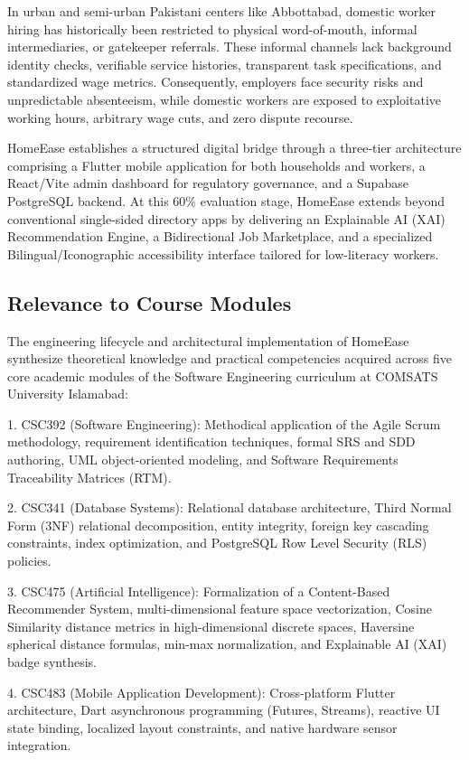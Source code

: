 \documentclass[12pt,a4paper]{article}
\begin{document}
In urban and semi-urban Pakistani centers like Abbottabad, domestic worker hiring has historically been restricted to physical word-of-mouth, informal intermediaries, or gatekeeper referrals. These informal channels lack background identity checks, verifiable service histories, transparent task specifications, and standardized wage metrics. Consequently, employers face security risks and unpredictable absenteeism, while domestic workers are exposed to exploitative working hours, arbitrary wage cuts, and zero dispute recourse.

HomeEase establishes a structured digital bridge through a three-tier architecture comprising a Flutter mobile application for both households and workers, a React/Vite admin dashboard for regulatory governance, and a Supabase PostgreSQL backend. At this 60\% evaluation stage, HomeEase extends beyond conventional single-sided directory apps by delivering an Explainable AI (XAI) Recommendation Engine, a Bidirectional Job Marketplace, and a specialized Bilingual/Iconographic accessibility interface tailored for low-literacy workers.

\subsection{Relevance to Course Modules}
The engineering lifecycle and architectural implementation of HomeEase synthesize theoretical knowledge and practical competencies acquired across five core academic modules of the Software Engineering curriculum at COMSATS University Islamabad:

1. CSC392 (Software Engineering): Methodical application of the Agile Scrum methodology, requirement identification techniques, formal SRS and SDD authoring, UML object-oriented modeling, and Software Requirements Traceability Matrices (RTM).

2. CSC341 (Database Systems): Relational database architecture, Third Normal Form (3NF) relational decomposition, entity integrity, foreign key cascading constraints, index optimization, and PostgreSQL Row Level Security (RLS) policies.

3. CSC475 (Artificial Intelligence): Formalization of a Content-Based Recommender System, multi-dimensional feature space vectorization, Cosine Similarity distance metrics in high-dimensional discrete spaces, Haversine spherical distance formulas, min-max normalization, and Explainable AI (XAI) badge synthesis.

4. CSC483 (Mobile Application Development): Cross-platform Flutter architecture, Dart asynchronous programming (Futures, Streams), reactive UI state binding, localized layout constraints, and native hardware sensor integration.
\end{document}
